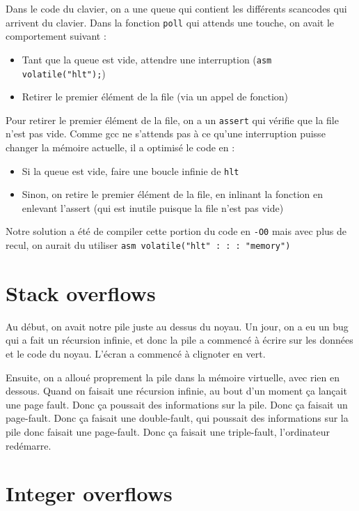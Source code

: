 \documentclass[12pt]{report}
\begin{document}
Dans le code du clavier, on a une queue qui contient les différents scancodes qui arrivent du clavier. Dans la fonction \verb$poll$ qui attends une touche, on avait le comportement suivant :
\begin{itemize}
    \item Tant que la queue est vide, attendre une interruption (\verb$asm volatile("hlt");$)
    \item Retirer le premier élément de la file (via un appel de fonction)
\end{itemize}

Pour retirer le premier élément de la file, on a un \verb$assert$ qui vérifie que la file n'est pas vide.
Comme gcc ne s'attends pas à ce qu'une interruption puisse changer la mémoire actuelle, il a optimisé le code en :
\begin{itemize}
    \item Si la queue est vide, faire une boucle infinie de \verb$hlt$
    \item Sinon, on retire le premier élément de la file, en inlinant la fonction en enlevant l'assert (qui est inutile puisque la file n'est pas vide)
\end{itemize}
Notre solution a été de compiler cette portion du code en \verb$-O0$ mais avec plus de recul, on aurait du utiliser \verb$asm volatile("hlt" : : : "memory")$

\section*{Stack overflows}

Au début, on avait notre pile juste au dessus du noyau. Un jour, on a eu un bug qui a fait un récursion infinie, et donc la pile a commencé à écrire sur les données et le code du noyau. L'écran a commencé à clignoter en vert.

Ensuite, on a alloué proprement la pile dans la mémoire virtuelle, avec rien en dessous. Quand on faisait une récursion infinie, au bout d'un moment ça lançait une page fault. Donc ça poussait des informations sur la pile. Donc ça faisait un page-fault. Donc ça faisait une double-fault, qui poussait des informations sur la pile donc faisait une page-fault. Donc ça faisait une triple-fault, l'ordinateur redémarre.

\section*{Integer overflows}
\end{document}
